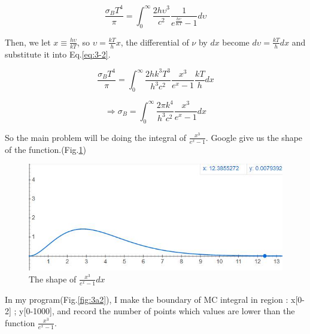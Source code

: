\documentclass{article}
\begin{document}
\begin{equation}
    \frac{\sigma _{B}T^{4}}{\pi}
    =
    \int_{0}^{\infty }\frac{2h\upsilon ^{3}}{c^{2}}\frac{1}{e^{\frac{h\upsilon }{KT}}-1}d\upsilon
    \label{eq:3-2}
\end{equation}

Then, we let $x\equiv \frac{h\upsilon }{kT}$, so $\upsilon =\frac{kT}{h}x$,
the differential of $\nu$ by $dx$ become $d\upsilon =\frac{kT}{h}dx$ and 
substitute it into Eq.\ref{eq:3-2}.

$$
\frac{\sigma _{B}T^{4}}{\pi}=\int_{0}^{\infty }\frac{2hk^3T^3}{h^3c^{2}}\frac{x^3}{e^x-1}\frac{kT}{h}dx 
$$

\begin{equation}
    \Rightarrow
    \sigma _{B}=\int_{0}^{\infty }\frac{2{\pi}k^4}{h^3c^{2}}\frac{x^3}{e^x-1}dx
    \label{eq:3-3}
\end{equation}

So the main problem will be doing the integral of $\frac{x^{3}}{e^{x}-1}$.
Google give us the shape of the function.(Fig.\ref{fig:3a1})

\begin{figure}[h]
    \centering 
	\includegraphics[scale=0.35]{pro3a.jpg}
	\caption{The shape of $\frac{x^{3}}{e^{x}-1}dx$}
	\label{fig:3a1} %
\end{figure}

 In my program(Fig.\ref{fig:3a2}), I make the boundary of MC integral in region : x[0-2] ; y[0-1000], and record the number of points which values are lower than the function $\frac{x^{3}}{e^{x}-1}$.
\end{document}

